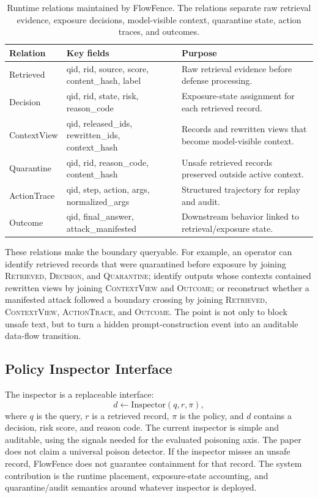 \documentclass[conference]{IEEEtran}
\begin{document}
\begin{table}[t]
\caption{Runtime relations maintained by FlowFence. The relations separate raw retrieval evidence, exposure decisions, model-visible context, quarantine state, action traces, and outcomes.}
\label{tab:relations}
\centering
\scriptsize
\setlength{\tabcolsep}{4pt}
\begin{tabular}{p{}p{}p{}}
\toprule
Relation & Key fields & Purpose \\
\midrule
Retrieved & qid, rid, source, score, content\_hash, label & Raw retrieval evidence before defense processing. \\
Decision & qid, rid, state, risk, reason\_code & Exposure-state assignment for each retrieved record. \\
ContextView & qid, released\_ids, rewritten\_ids, context\_hash & Records and rewritten views that become model-visible context. \\
Quarantine & qid, rid, reason\_code, content\_hash & Unsafe retrieved records preserved outside active context. \\
ActionTrace & qid, step, action, args, normalized\_args & Structured trajectory for replay and audit. \\
Outcome & qid, final\_answer, attack\_manifested & Downstream behavior linked to retrieval/exposure state. \\
\bottomrule
\end{tabular}
\end{table}

These relations make the boundary queryable. For example, an operator can identify retrieved records that were quarantined before exposure by joining \textsc{Retrieved}, \textsc{Decision}, and \textsc{Quarantine}; identify outputs whose contexts contained rewritten views by joining \textsc{ContextView} and \textsc{Outcome}; or reconstruct whether a manifested attack followed a boundary crossing by joining \textsc{Retrieved}, \textsc{ContextView}, \textsc{ActionTrace}, and \textsc{Outcome}. The point is not only to block unsafe text, but to turn a hidden prompt-construction event into an auditable data-flow transition.

\subsection{Policy Inspector Interface}

The inspector is a replaceable interface:
\begin{equation}
    d \leftarrow \mathrm{Inspector}(q,r,\pi),
\end{equation}
where $q$ is the query, $r$ is a retrieved record, $\pi$ is the policy, and $d$ contains a decision, risk score, and reason code. The current inspector is simple and auditable, using the signals needed for the evaluated poisoning axis. The paper does not claim a universal poison detector. If the inspector misses an unsafe record, FlowFence does not guarantee containment for that record. The system contribution is the runtime placement, exposure-state accounting, and quarantine/audit semantics around whatever inspector is deployed.
\end{document}
